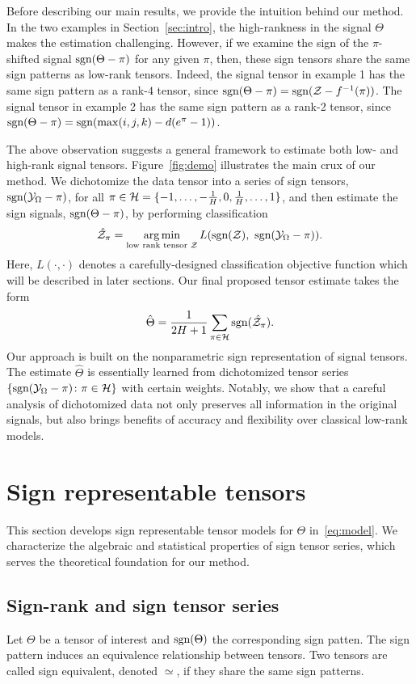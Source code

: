\documentclass{article}
\theoremstyle{plain}
\theoremstyle{definition}
\def\sign{\textup{sgn}}
\begin{document}
Before describing our main results, we provide the intuition behind our method. In the two examples in Section~\ref{sec:intro}, the high-rankness in the signal $\Theta$ makes the estimation challenging. However, if we examine the sign of the $\pi$-shifted signal $\sign(\Theta-\pi)$ for any given $\pi$, then, these sign tensors share the same sign patterns as low-rank tensors. Indeed, the signal tensor in example 1 has the same sign pattern as a rank-$4$ tensor, since $\sign(\Theta-\pi)=\sign(\tZ-f^{-1}(\pi))$. The signal tensor in example 2 has the same sign pattern as a rank-2 tensor, since $\sign(\Theta-\pi)=\sign(\max(i,j,k)-d(e^{\pi}-1))$.


The above observation suggests a general framework to estimate both low- and high-rank signal tensors. Figure~\ref{fig:demo} illustrates the main crux of our method. We dichotomize the data tensor into a series of sign tensors, $\sign (\tY_\Omega-\pi)$, for all $\pi\in \tH={\{\small-1,\ldots,  -{1\over H},0, {1\over H},\ldots,1\}}$, and then estimate the sign signals, $\sign(\Theta-\pi)$, by performing classification
\[
\hat \tZ_\pi=\argmin_{\text{low rank tensor $\tZ$}} L(\sign(\tZ),\ \sign (\tY_\Omega-\pi)).
\]
Here, $L(\cdot,\cdot)$ denotes a carefully-designed classification objective function which will be described in later sections. Our final proposed tensor estimate takes the form
\[
\hat \Theta = {1\over 2H+1}\sum_{\pi \in \tH} \sign(\hat \tZ_\pi).
\]
Our approach is built on the nonparametric sign representation of signal tensors. The estimate $\hat \Theta$ is essentially learned from dichotomized tensor series $\{\sign(\tY_\Omega-\pi)\colon \pi \in \tH\}$ with certain weights. Notably, we show that a careful analysis of dichotomized data not only preserves all information in the original signals, but also brings benefits of accuracy and flexibility over classical low-rank models. 



\section{Sign representable tensors}\label{sec:representation}
This section develops sign representable tensor models for $\Theta$ in~\eqref{eq:model}. We characterize the algebraic and statistical properties of sign tensor series, which serves the theoretical foundation for our method. 

\subsection{Sign-rank and sign tensor series}\label{sec:sign-rank}
Let $\Theta$ be a tensor of interest and $\sign (\Theta)$ the corresponding sign patten. The sign pattern induces an equivalence relationship between tensors. Two tensors are called sign equivalent, denoted $\simeq$, if they share the same sign patterns. 
\end{document}
